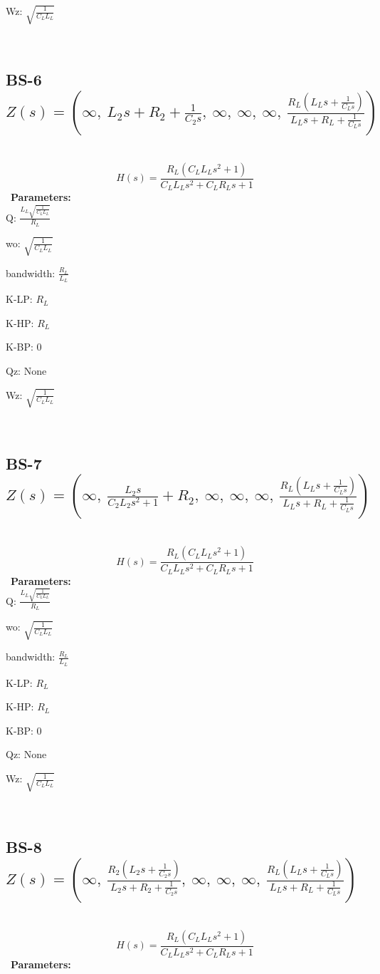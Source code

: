 \documentclass{article}
\begin{document}
Wz: $\sqrt{\frac{1}{C_{L} L_{L}}}$\ 

\ 

\subsection{BS-6 $Z(s) = \left( \infty, \  L_{2} s + R_{2} + \frac{1}{C_{2} s}, \  \infty, \  \infty, \  \infty, \  \frac{R_{L} \left(L_{L} s + \frac{1}{C_{L} s}\right)}{L_{L} s + R_{L} + \frac{1}{C_{L} s}}\right)$ } \ 
\textbf{\[H(s) = \frac{R_{L} \left(C_{L} L_{L} s^{2} + 1\right)}{C_{L} L_{L} s^{2} + C_{L} R_{L} s + 1}\] } \ 
\textbf{Parameters:}\\ 

Q: $\frac{L_{L} \sqrt{\frac{1}{C_{L} L_{L}}}}{R_{L}}$\ 

wo: $\sqrt{\frac{1}{C_{L} L_{L}}}$\ 

bandwidth: $\frac{R_{L}}{L_{L}}$\ 

K-LP: $R_{L}$\ 

K-HP: $R_{L}$\ 

K-BP: $0$\ 

Qz: $\text{None}$\ 

Wz: $\sqrt{\frac{1}{C_{L} L_{L}}}$\ 

\ 

\subsection{BS-7 $Z(s) = \left( \infty, \  \frac{L_{2} s}{C_{2} L_{2} s^{2} + 1} + R_{2}, \  \infty, \  \infty, \  \infty, \  \frac{R_{L} \left(L_{L} s + \frac{1}{C_{L} s}\right)}{L_{L} s + R_{L} + \frac{1}{C_{L} s}}\right)$ } \ 
\textbf{\[H(s) = \frac{R_{L} \left(C_{L} L_{L} s^{2} + 1\right)}{C_{L} L_{L} s^{2} + C_{L} R_{L} s + 1}\] } \ 
\textbf{Parameters:}\\ 

Q: $\frac{L_{L} \sqrt{\frac{1}{C_{L} L_{L}}}}{R_{L}}$\ 

wo: $\sqrt{\frac{1}{C_{L} L_{L}}}$\ 

bandwidth: $\frac{R_{L}}{L_{L}}$\ 

K-LP: $R_{L}$\ 

K-HP: $R_{L}$\ 

K-BP: $0$\ 

Qz: $\text{None}$\ 

Wz: $\sqrt{\frac{1}{C_{L} L_{L}}}$\ 

\ 

\subsection{BS-8 $Z(s) = \left( \infty, \  \frac{R_{2} \left(L_{2} s + \frac{1}{C_{2} s}\right)}{L_{2} s + R_{2} + \frac{1}{C_{2} s}}, \  \infty, \  \infty, \  \infty, \  \frac{R_{L} \left(L_{L} s + \frac{1}{C_{L} s}\right)}{L_{L} s + R_{L} + \frac{1}{C_{L} s}}\right)$ } \ 
\textbf{\[H(s) = \frac{R_{L} \left(C_{L} L_{L} s^{2} + 1\right)}{C_{L} L_{L} s^{2} + C_{L} R_{L} s + 1}\] } \ 
\textbf{Parameters:}\\ 
\end{document}
